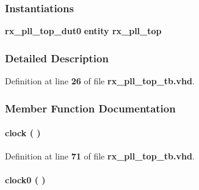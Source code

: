 \subsubsection*{Instantiations}
 \begin{DoxyCompactItemize}
\item 
{\bf rx\+\_\+pll\+\_\+top\+\_\+dut0}  {\bfseries entity rx\+\_\+pll\+\_\+top}   
\end{DoxyCompactItemize}


\subsubsection{Detailed Description}


Definition at line {\bf 26} of file {\bf rx\+\_\+pll\+\_\+top\+\_\+tb.\+vhd}.



\subsubsection{Member Function Documentation}
\paragraph[{clock}]{\setlength{\rightskip}{0pt plus 5cm} {\bfseries \textcolor{vhdlchar}{ }} clock ( ) \hspace{0.3cm}{\ttfamily [Process]}}\label{classrx__pll__top__tb_1_1tb__behave_af761a67e9d7ce9e23381088b6f2ae893}


Definition at line {\bf 71} of file {\bf rx\+\_\+pll\+\_\+top\+\_\+tb.\+vhd}.

\paragraph[{clock0}]{\setlength{\rightskip}{0pt plus 5cm} {\bfseries \textcolor{vhdlchar}{ }} clock0 ( ) \hspace{0.3cm}{\ttfamily [Process]}}\label{classrx__pll__top__tb_1_1tb__behave_a0ffcf9b3fa89917ed2b73a96f170b7ae}



